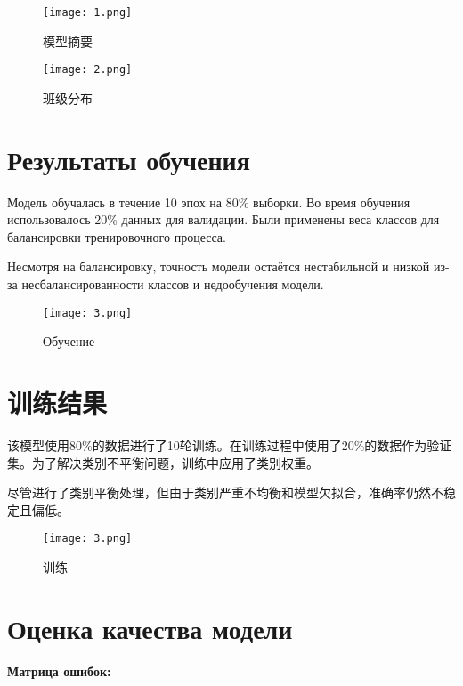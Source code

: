 \documentclass{article}
\providecommand{\pcsync}{\par\vspace{\baselineskip}}
\begin{document}
\begin{paracol}{2}
\begin{figure}[H]
    \centering
    \texttt{[image: 1.png]}
    \caption{模型摘要}
    \label{fig:enter-label}
\end{figure}

\begin{figure}[H]
    \centering
    \texttt{[image: 2.png]}
    \caption{班级分布}
    \label{fig:enter-label}
\end{figure}

\switchcolumn*





\section{Результаты обучения}
\pcsync
Модель обучалась в течение 10 эпох на 80\% выборки. Во время обучения использовалось 20\% данных для валидации. Были применены веса классов для балансировки тренировочного процесса.

Несмотря на балансировку, точность модели остаётся нестабильной и низкой из-за несбалансированности классов и недообучения модели.

\begin{figure}[H]
    \centering
    \texttt{[image: 3.png]}
    \caption{Обучение}
    \label{fig:enter-label}
\end{figure}

\switchcolumn

\section{训练结果}
\pcsync
该模型使用80\%的数据进行了10轮训练。在训练过程中使用了20\%的数据作为验证集。为了解决类别不平衡问题，训练中应用了类别权重。

尽管进行了类别平衡处理，但由于类别严重不均衡和模型欠拟合，准确率仍然不稳定且偏低。


\begin{figure}[H]
    \centering
    \texttt{[image: 3.png]}
    \caption{训练}
    \label{fig:enter-label}
\end{figure}


\switchcolumn*








\section{Оценка качества модели}
\pcsync
\textbf{Матрица ошибок:}


\end{paracol}
\end{document}
